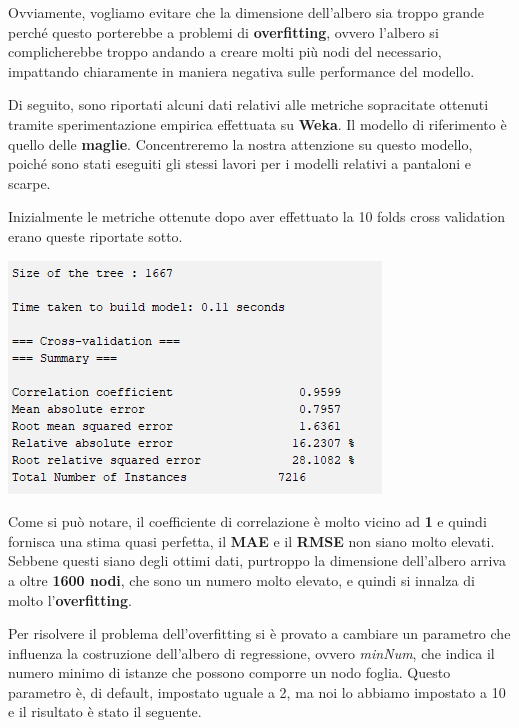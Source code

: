 \documentclass[a4paper, 11pt, oneside]{report}
\begin{document}
                Ovviamente, vogliamo evitare che la dimensione dell'albero sia troppo grande perché questo porterebbe a problemi
                di \textbf{overfitting}, ovvero l'albero si complicherebbe troppo andando a creare molti più nodi
                del necessario, impattando chiaramente in maniera negativa sulle performance del modello.
                \\
                \par \noindent Di seguito, sono riportati alcuni dati relativi alle metriche sopracitate ottenuti tramite
                sperimentazione empirica effettuata su \textbf{Weka}.
                Il modello di riferimento è quello delle \textbf{maglie}. Concentreremo la nostra attenzione su questo
                modello, poiché sono stati eseguiti gli stessi lavori per i modelli relativi a pantaloni e scarpe.
                \newpage
                \par \noindent Inizialmente le metriche ottenute dopo aver effettuato la 10 folds cross validation
                erano queste riportate sotto.

                \begin{center}
                    \includegraphics[scale=0.8]{metricheIniziali}
                \end{center}
                \par \noindent Come si può notare, il coefficiente di correlazione è molto vicino ad \textbf{1} e quindi
                fornisca una stima quasi perfetta, il \textbf{MAE} e il \textbf{RMSE} non siano molto elevati.
                Sebbene questi siano degli ottimi dati, purtroppo la dimensione dell'albero arriva a oltre \textbf{1600 nodi}, che
                sono un numero molto elevato, e quindi si innalza di molto l'\textbf{overfitting}.
                \\
                \par \noindent Per risolvere il problema dell'overfitting si è provato a cambiare un parametro che influenza la costruzione dell'albero
                di regressione, ovvero \textit{minNum}, che indica il numero minimo di istanze che possono comporre un nodo
                foglia.
                Questo parametro è, di default, impostato uguale a 2, ma noi lo abbiamo impostato a 10 e il risultato è stato il seguente.
\end{document}

